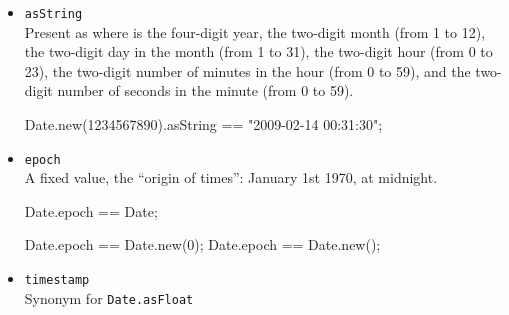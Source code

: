 \begin{itemize}
\item \lstinline|asString|\\
  Present as  where  is the four-digit
  year,  the two-digit month (from 1 to 12),  the
  two-digit day in the month (from 1 to 31),  the two-digit
  hour (from 0 to 23),  the two-digit number of minutes in the
  hour (from 0 to 59), and  the two-digit number of seconds in
  the minute (from 0 to 59).
\begin{urbiassert}[firstnumber=last]
Date.new(1234567890).asString == "2009-02-14 00:31:30";
\end{urbiassert}

\item \lstinline|epoch|\\
  A fixed value, the ``origin of times'': January 1st 1970, at
  midnight.
\begin{urbiassert}[firstnumber=last]
Date.epoch == Date;

Date.epoch == Date.new(0);
Date.epoch == Date.new();
\end{urbiassert}

\item \lstinline|timestamp|\\
Synonym for \lstinline|Date.asFloat|

\end{itemize}


